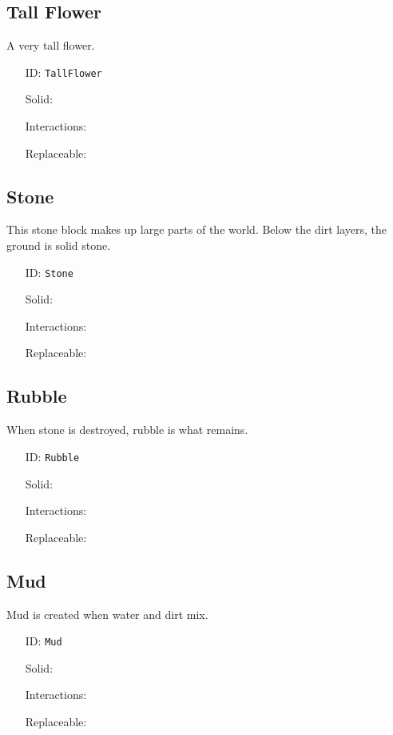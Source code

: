 \subsection{Tall Flower}\label{subsec:blocks_tall flower}
A very tall flower.
\newline
\begin{itemize}[nosep]
    \item[ID:] \texttt{TallFlower}
    \item[Solid:]  \XSolidBrush \item[Interactions:]  \XSolidBrush \item[Replaceable:]  \XSolidBrush
\end{itemize}

\subsection{Stone}\label{subsec:blocks_stone}
This stone block makes up large parts of the world. Below the dirt layers, the ground is solid stone.
\newline
\begin{itemize}[nosep]
    \item[ID:] \texttt{Stone}
    \item[Solid:]  \Checkmark \item[Interactions:]  \XSolidBrush \item[Replaceable:]  \XSolidBrush
\end{itemize}

\subsection{Rubble}\label{subsec:blocks_rubble}
When stone is destroyed, rubble is what remains.
\newline
\begin{itemize}[nosep]
    \item[ID:] \texttt{Rubble}
    \item[Solid:]  \Checkmark \item[Interactions:]  \XSolidBrush \item[Replaceable:]  \XSolidBrush
\end{itemize}

\subsection{Mud}\label{subsec:blocks_mud}
Mud is created when water and dirt mix.
\newline
\begin{itemize}[nosep]
    \item[ID:] \texttt{Mud}
    \item[Solid:]  \Checkmark \item[Interactions:]  \XSolidBrush \item[Replaceable:]  \XSolidBrush
\end{itemize}

